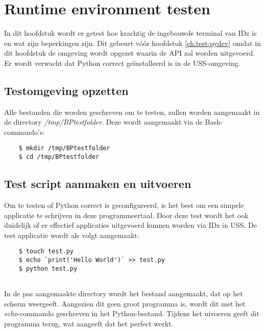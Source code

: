 \chapter{Runtime environment testen}
\label{ch:test-runtime}
In dit hoofdstuk wordt er getest hoe krachtig de ingebouwde terminal van IDz is en wat zijn beperkingen zijn. Dit gebeurt vóór hoofdstuk \ref{ch:test-pydev} omdat in dit hoofdstuk de omgeving wordt opgezet waarin de API zal worden uitgevoerd. \\
Er wordt verwacht dat Python correct geïnstalleerd is in de USS-omgeving.

\section{Testomgeving opzetten}
Alle bestanden die worden geschreven om te testen, zullen worden aangemaakt in de directory \textit{/tmp/BPtestfolder}. 
Deze wordt aangemaakt via de Bash-commando's: 

\begin{lstlisting}
    $ mkdir /tmp/BPtestfolder
    $ cd /tmp/BPtestfolder
\end{lstlisting}

\section{Test script aanmaken en uitvoeren}
Om te testen of Python correct is geconfigureerd, is het best om een simpele applicatie te schrijven in deze programmeertaal. Door deze test wordt het ook duidelijk of er effectief applicaties uitgevoerd kunnen worden via IDz in USS. De test applicatie wordt als volgt aangemaakt:


\begin{lstlisting}
    $ touch test.py
    $ echo `print('Hello World')` >> test.py
    $ python test.py
    
\end{lstlisting}

In de pas aangemaakte directory wordt het bestand  aangemaakt, dat  op het scherm weergeeft. Aangezien dit geen groot programma is, wordt dit met het \textit{echo}-commando geschreven in het Python-bestand. Tijdens het uivoeren geeft dit programma  terug, wat aangeeft dat het perfect werkt.

